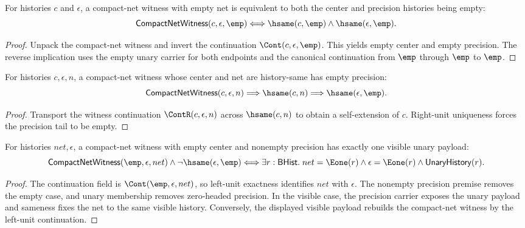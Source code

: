 \begin{theorem}
\label{thm:compact-net-witness-empty-net-iff}
For histories $c$ and $\epsilon$, a compact-net witness with empty net is
equivalent to both the center and precision histories being empty:
$$
\mathsf{CompactNetWitness}(c,\epsilon,\emp)
\Longleftrightarrow
\hsame(c,\emp)\land\hsame(\epsilon,\emp).
$$
\end{theorem}
\begin{proof}
Unpack the compact-net witness and invert the continuation
$\Cont(c,\epsilon,\emp)$. This yields empty center and empty precision. The
reverse implication uses the empty unary carrier for both endpoints and the
canonical continuation from $\emp$ through $\emp$ to $\emp$.
\end{proof}

\begin{theorem}
\label{thm:compact-net-witness-endpoint-cycle-precision-empty}
For histories $c,\epsilon,n$, a compact-net witness whose center and net are
history-same has empty precision:
$$
\mathsf{CompactNetWitness}(c,\epsilon,n)\Longrightarrow
\hsame(c,n)\Longrightarrow\hsame(\epsilon,\emp).
$$
\end{theorem}
\begin{proof}
Transport the witness continuation $\ContR(c,\epsilon,n)$ across
$\hsame(c,n)$ to obtain a self-extension of $c$. Right-unit uniqueness forces
the precision tail to be empty.
\end{proof}

\begin{theorem}
\label{thm:compact-empty-center-nonempty-precision-shape}
For histories $net,\epsilon$, a compact-net witness with empty center and
nonempty precision has exactly one visible unary payload:
$$
\mathsf{CompactNetWitness}(\emp,\epsilon,net)\wedge\neg\hsame(\epsilon,\emp)
\Longleftrightarrow
\exists r:\mathsf{BHist}.\;
net=\Eone(r)\wedge \epsilon=\Eone(r)\wedge\mathsf{UnaryHistory}(r).
$$
\end{theorem}
\begin{proof}
The continuation field is $\Cont(\emp,\epsilon,net)$, so left-unit exactness
identifies $net$ with $\epsilon$. The nonempty precision premise removes the
empty case, and unary membership removes zero-headed precision. In the visible
case, the precision carrier exposes the unary payload and sameness fixes the
net to the same visible history. Conversely, the displayed visible payload
rebuilds the compact-net witness by the left-unit continuation.
\end{proof}

